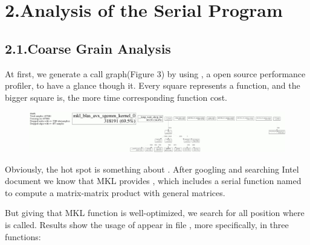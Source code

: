 \documentclass{article}
\begin{document}
\section{2.\hspace*{0.5em}Analysis of the Serial Program}\label{sec-analysis-of-the-serial-program}%

\subsection{2.1.\hspace*{0.5em}Coarse Grain Analysis}\label{sec-coarse-grain-analysis}%

\noindent{}At first, we generate a call graph(Figure 3) by using , a open source performance profiler, to have a glance though it. Every square represents a function, and the bigger square is, the more time corresponding function cost.%

\begin{figure}[tbp]%
\begin{mdcenter}%

\noindent{}\includegraphics[keepaspectratio=true,width=\dimmin{}{\dimwidth{0.90}}]{images/100001994364201}{}%

\mdhr{}%

\noindent{}%
\end{mdcenter}\label{fig-myfigure}%
\end{figure}%

Obviously, the hot spot is something about . After googling
and searching Intel document we know that MKL provides , which includes a serial function named 
to compute a matrix-matrix product with general matrices.%

But giving that MKL function is well-optimized, we search for all position where  is called. Results show the usage of  appear in file , more specifically, in three functions:%
\end{document}
